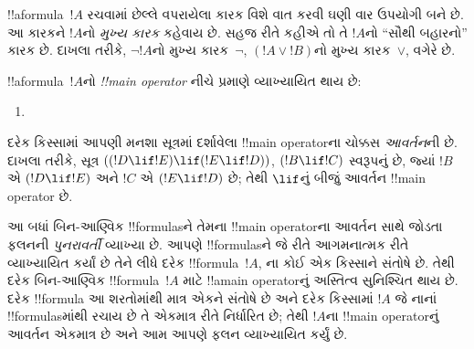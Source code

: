 \documentclass[../../../include/open-logic-section]{subfiles}
\begin{document}


\begin{explain}
!!a{formula}~$!A$ રચવામાં છેલ્લે વપરાયેલા કારક વિશે વાત કરવી ઘણી
વાર ઉપયોગી બને છે. આ કારકને $!A$નો \emph{મુખ્ય કારક} કહેવાય છે.
સહજ રીતે કહીએ તો તે $!A$નો ``સૌથી બહારનો'' કારક છે. દાખલા તરીકે,
$\lnot !A$નો મુખ્ય કારક~$\lnot$, $(!A\lor !B)$નો મુખ્ય કારક~$\lor$,
વગેરે છે.
\end{explain}


\begin{defn}
!!a{formula}~$!A$નો \emph{!!{main operator}} નીચે પ્રમાણે
વ્યાખ્યાયિત થાય છે:
\begin{enumerate}
\item {}







\end{enumerate}
\end{defn}

દરેક કિસ્સામાં આપણી મનશા સૂત્રમાં દર્શાવેલા !!{main operator}ના ચોક્કસ
\emph{આવર્તન}ની છે. દાખલા તરીકે, સૂત્ર
$((!D\lif !E)\lif(!E\lif !D))$, $(!B\lif !C)$ સ્વરૂપનું છે, જ્યાં
$!B$ એ $(!D\lif !E)$ અને $!C$ એ $(!E\lif !D)$ છે; તેથી $\lif$નું
બીજું આવર્તન !!{main operator} છે.

\begin{explain}
આ બધાં બિન-આણ્વિક !!{formula}sને તેમના !!{main operator}ના આવર્તન
સાથે જોડતા ફલનની \emph{પુનરાવર્તી} વ્યાખ્યા છે. આપણે
!!{formula}sને જે રીતે આગમનાત્મક રીતે વ્યાખ્યાયિત કર્યાં છે તેને
લીધે દરેક !!{formula}~$!A$, ના કોઈ એક કિસ્સાને
સંતોષે છે. તેથી દરેક બિન-આણ્વિક !!{formula}~$!A$ માટે !!a{main
  operator}નું અસ્તિત્વ સુનિશ્ચિત થાય છે. દરેક !!{formula} આ શરતોમાંથી
માત્ર એકને સંતોષે છે અને દરેક કિસ્સામાં $!A$ જે નાનાં
!!{formula}sમાંથી રચાય છે તે એકમાત્ર રીતે નિર્ધારિત છે; તેથી $!A$ના
!!{main
  operator}નું આવર્તન એકમાત્ર છે અને આમ આપણે ફલન
વ્યાખ્યાયિત કર્યું છે.
\end{explain}
\end{document}
